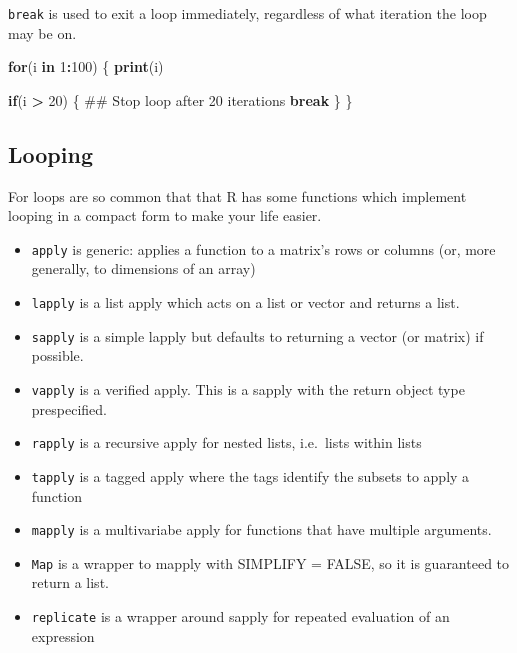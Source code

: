 \documentclass[]{book}
\newenvironment{Shaded}{\begin{snugshade}}{\end{snugshade}}
\newcommand{\KeywordTok}[1]{\textcolor[rgb]{0.13,0.29,0.53}{\textbf{#1}}}
\newcommand{\DecValTok}[1]{\textcolor[rgb]{0.00,0.00,0.81}{#1}}
\newcommand{\StringTok}[1]{\textcolor[rgb]{0.31,0.60,0.02}{#1}}
\newcommand{\ControlFlowTok}[1]{\textcolor[rgb]{0.13,0.29,0.53}{\textbf{#1}}}
\newcommand{\OperatorTok}[1]{\textcolor[rgb]{0.81,0.36,0.00}{\textbf{#1}}}
\newcommand{\NormalTok}[1]{#1}
\providecommand{\tightlist}{%
  \setlength{\itemsep}{0pt}\setlength{\parskip}{0pt}}
\theoremstyle{definition}
\theoremstyle{definition}
\theoremstyle{definition}
\theoremstyle{remark}
\begin{document}
\texttt{break} is used to exit a loop immediately, regardless of what
iteration the loop may be on.

\begin{Shaded}
\begin{Highlighting}[]
\ControlFlowTok{for}\NormalTok{(i }\ControlFlowTok{in} \DecValTok{1}\OperatorTok{:}\DecValTok{100}\NormalTok{) \{}
      \KeywordTok{print}\NormalTok{(i)}

      \ControlFlowTok{if}\NormalTok{(i }\OperatorTok{>}\StringTok{ }\DecValTok{20}\NormalTok{) \{}
\NormalTok{              ## Stop loop after 20 iterations}
              \ControlFlowTok{break}  
\NormalTok{      \}     }
\NormalTok{\}}
\end{Highlighting}
\end{Shaded}

\subsection{Looping}\label{looping}

For loops are so common that that R has some functions which implement
looping in a compact form to make your life easier.

\begin{itemize}
\tightlist
\item
  \texttt{apply} is generic: applies a function to a matrix's rows or
  columns (or, more generally, to dimensions of an array)
\item
  \texttt{lapply} is a list apply which acts on a list or vector and
  returns a list.
\item
  \texttt{sapply} is a simple lapply but defaults to returning a vector
  (or matrix) if possible.
\item
  \texttt{vapply} is a verified apply. This is a sapply with the return
  object type prespecified.
\item
  \texttt{rapply} is a recursive apply for nested lists, i.e.~lists
  within lists
\item
  \texttt{tapply} is a tagged apply where the tags identify the subsets
  to apply a function
\item
  \texttt{mapply} is a multivariabe apply for functions that have
  multiple arguments.
\item
  \texttt{Map} is a wrapper to mapply with SIMPLIFY = FALSE, so it is
  guaranteed to return a list.
\item
  \texttt{replicate} is a wrapper around sapply for repeated evaluation
  of an expression
\end{itemize}
\end{document}
